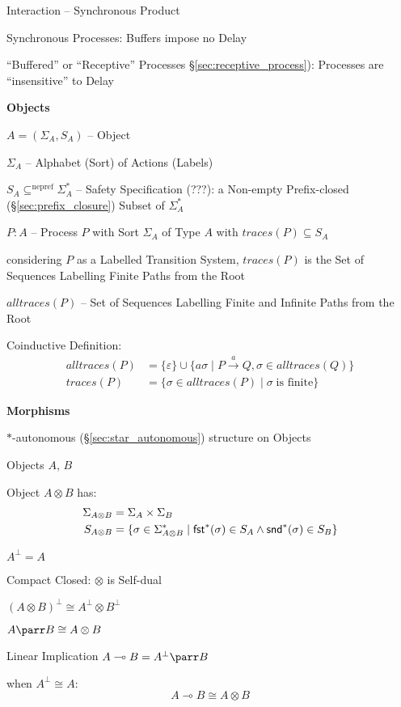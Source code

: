 Interaction -- Synchronous Product

Synchronous Processes: Buffers impose no Delay

``Buffered'' or ``Receptive'' Processes
\S\ref{sec:receptive_process}): Processes are ``insensitive'' to
Delay %


\textbf{Objects}

$A = (\Sigma_A,S_A)$ -- Object

$\Sigma_A$ -- Alphabet (Sort) of Actions (Labels)

$S_A \subseteq^{\text{nepref}} \Sigma_A^*$ -- Safety Specification
(???): a Non-empty Prefix-closed (\S\ref{sec:prefix_closure}) Subset
of $\Sigma_A^*$

$P : A$ -- Process $P$ with Sort $\Sigma_A$ of Type $A$ with
$traces(P) \subseteq S_A$

considering $P$ as a Labelled Transition System, $traces(P)$ is the
Set of Sequences Labelling Finite Paths from the Root

$alltraces(P)$ -- Set of Sequences Labelling Finite and Infinite Paths
from the Root

Coinductive Definition:
\begin{align*}
  alltraces(P) &= \{\varepsilon\} \cup \{a \sigma
    \mid P \xrightarrow{a} Q, \sigma \in alltraces(Q)\} \\
  traces(P) &= \{\sigma \in alltraces(P)
    \mid \sigma \;\text{is finite}\}
\end{align*}


\textbf{Morphisms}

$*$-autonomous (\S\ref{sec:star_autonomous}) structure on Objects

Objects $A$, $B$

Object $A \otimes B$ has:
\begin{align*}
  \Sigma_{A \otimes B} &= \Sigma_A \times \Sigma_B \\
  S_{A \otimes B} &= \{\sigma \in \Sigma_{A \otimes B}^*
    \mid \mathsf{fst}^*(\sigma) \in S_A \wedge \mathsf{snd}^*(\sigma) \in S_B\}
\end{align*}

$A^\bot = A$

Compact Closed: $\otimes$ is Self-dual

$(A \otimes B)^\bot \cong A^\bot \otimes B^\bot$

$A \parr B \cong A \otimes B$

Linear Implication $A \multimap B = A^\bot \parr B$

when $A^\bot \cong A$:
\[
  A \multimap B \cong A \otimes B
\]

